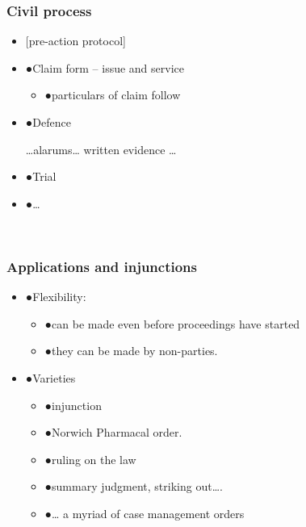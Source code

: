 \documentclass[ignorenonframetext,]{beamer}
\begin{document}
\begin{frame}
\frametitle{Civil process}

\begin{itemize}
\item  {[}pre-action protocol{]}
\item  {●}Claim form -- issue and service

  \begin{itemize}
  \item    {●}particulars of claim follow
  \end{itemize}
\item  {●}Defence

  {}\ldots{}{alarums\ldots{}}{ }{written}{ }{evidence}{ \ldots{}}
\item  {●}Trial
\item  {●}\ldots{}
\end{itemize}

~


\end{frame}

\begin{frame}
\frametitle{Applications and injunctions}

\begin{itemize}
\item  {●}Flexibility:

  \begin{itemize}
  \item    {●}can be made even before proceedings have started
  \item    {●}they can be made by non-parties.
  \end{itemize}
\item  {●}Varieties

  \begin{itemize}
  \item    {●}injunction
  \item    {●}Norwich Pharmacal order.
  \item    {●}ruling on the law
  \item    {●}summary judgment, striking out\ldots{}.
  \item    {●}\ldots{} a myriad of case management orders
  \end{itemize}
\end{itemize}

~


\end{frame}
\end{document}
